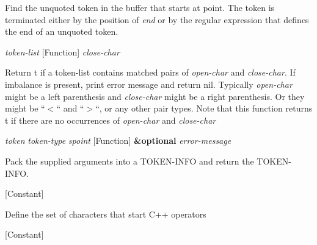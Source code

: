 \begin{doc-string}
Find the unquoted token in the buffer that starts at point.  The token is
terminated either by the position of \emph{end} or by the regular expression that
defines the end of an unquoted token.
\end{doc-string}

\vspace{1em}
\noindent
{}
\usebox{\funcname}\emph{token-list}
 \hfill [Function]
\hspace*{\wd\funcname}\emph{close-char}

\begin{doc-string}
Return t if a token-list contains matched pairs of \emph{open-char} and \emph{close-char}.
If imbalance is present, print error message and return nil.  Typically \emph{open-char}
might be a left parenthesis and \emph{close-char} might be a right parenthesis.  Or they
might be ``$<$`` and ``$>$``, or any other pair types.  Note that this function
returns t if there are no occurrences of \emph{open-char} and \emph{close-char}
\end{doc-string}

\vspace{1em}
\noindent
{}
\usebox{\funcname}\emph{token} \emph{token-type} \emph{spoint}
 \hfill [Function]
\hspace*{\wd\funcname}\textbf{\&optional} \emph{error-message}

\begin{doc-string}
Pack the supplied arguments into a TOKEN-INFO and return the TOKEN-INFO.
\end{doc-string}

\vspace{1em}
\noindent
{}
\usebox{\funcname}
 \hfill [Constant]

\begin{doc-string}
Define the set of characters that start C++ operators
\end{doc-string}

\vspace{1em}
\noindent
{}
\usebox{\funcname}
 \hfill [Constant]

